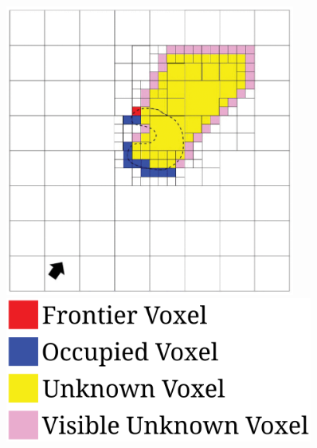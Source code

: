 \documentclass{beamer}
\begin{document}
\begin{frame}{}
	\begin{figure}
		\begin{minipage}[t]{0.7\textwidth}
			\centering
			\includegraphics[width=0.85\textwidth]{Graphics/vasquez.png}
		\end{minipage}
		\hfill
		\begin{minipage}[t]{0.29\textwidth}
			\includegraphics[width=0.9\textwidth]{Graphics/legend.png}
		\end{minipage}

		\caption{\cite{vasquez-gomez_vpl_2020}}
	\end{figure}
\end{frame}
\end{document}
